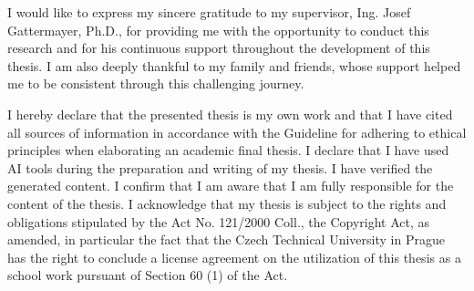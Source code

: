 \documentclass[english,master,oneside]{ctufit-thesis}
\begin{document}
\frontmatter\frontmatterinit %

\thispagestyle{empty}\maketitle\thispagestyle{empty}\cleardoublepage %


\imprintpage %
\stopTOCentries

\begin{acknowledgmentpage}
I would like to express my sincere gratitude to my supervisor, Ing. Josef Gattermayer, Ph.D., for providing me with the opportunity to conduct this research and for his continuous support throughout the development of this thesis. I am also deeply thankful to my family and friends, whose support helped me to be consistent through this challenging journey.
\end{acknowledgmentpage}


\begin{declarationpage}
I hereby declare that the presented thesis is my own work and that I have
cited all sources of information in accordance with the Guideline for adhering
to ethical principles when elaborating an academic final thesis. I declare that
I have used AI tools during the preparation and writing of my thesis. I have
verified the generated content. I confirm that I am aware that I am fully
responsible for the content of the thesis. I acknowledge that my thesis is
subject to the rights and obligations stipulated by the Act No. 121/2000
Coll., the Copyright Act, as amended, in particular the fact that the Czech
Technical University in Prague has the right to conclude a license agreement
on the utilization of this thesis as a school work pursuant of Section 60 (1) of the Act.
\end{declarationpage}
\end{document}
